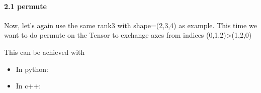 \documentclass[letterpaper,10pt,english]{sphinxmanual}
\begin{document}
\paragraph{2.1 permute}
\label{\detokenize{guide/basic_obj/Tensor_2_manip:permute}}
Now, let’s again use the same rank\sphinxhyphen{}3  with shape=(2,3,4) as example. This time we want to do permute on the Tensor to exchange axes from indices (0,1,2)\sphinxhyphen{}\textgreater{}(1,2,0)

This can be achieved with 
\begin{itemize}
\item {} 
In python:

\end{itemize}

\begin{sphinxVerbatim}[commandchars=\\\{\},numbers=left,firstnumber=1,stepnumber=1]
  
  
\end{sphinxVerbatim}
\begin{itemize}
\item {} 
In c++:

\end{itemize}

\begin{sphinxVerbatim}[commandchars=\\\{\},numbers=left,firstnumber=1,stepnumber=1]
   
   
    
    
\end{sphinxVerbatim}
\end{document}
